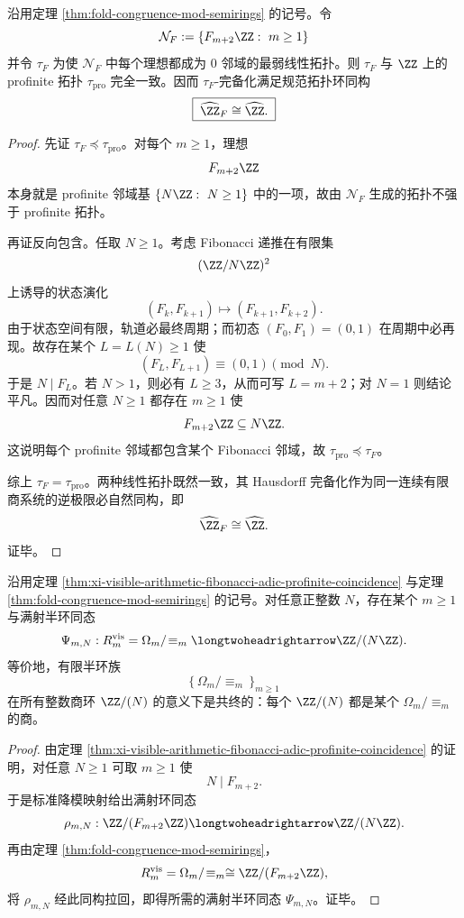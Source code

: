 \begin{theorem}\label{thm:xi-visible-arithmetic-fibonacci-adic-profinite-coincidence}
沿用定理 \ref{thm:fold-congruence-mod-semirings} 的记号。令
\[
\mathcal N_F:=\{F_{m+2}\ZZ:\ m\ge 1\}
\]
并令 \(\tau_F\) 为使 \(\mathcal N_F\) 中每个理想都成为 \(0\) 邻域的最弱线性拓扑。则 \(\tau_F\) 与 \(\ZZ\) 上的 profinite 拓扑 \(\tau_{\mathrm{pro}}\) 完全一致。因而 \(\tau_F\)-完备化满足规范拓扑环同构
\[
\boxed{\;
\widehat{\ZZ}_F\cong \widehat{\ZZ}.\;}
\]
\end{theorem}
\begin{proof}
先证 \(\tau_F\preceq\tau_{\mathrm{pro}}\)。对每个 \(m\ge 1\)，理想
\[
F_{m+2}\ZZ
\]
本身就是 profinite 邻域基 \(\{N\ZZ:\ N\ge 1\}\) 中的一项，故由 \(\mathcal N_F\) 生成的拓扑不强于 profinite 拓扑。

再证反向包含。任取 \(N\ge 1\)。考虑 Fibonacci 递推在有限集
\[
(\ZZ/N\ZZ)^2
\]
上诱导的状态演化
\[
(F_k,F_{k+1})\longmapsto (F_{k+1},F_{k+2}).
\]
由于状态空间有限，轨道必最终周期；而初态 \((F_0,F_1)=(0,1)\) 在周期中必再现。故存在某个 \(L=L(N)\ge 1\) 使
\[
(F_L,F_{L+1})\equiv (0,1)\pmod N.
\]
于是 \(N\mid F_L\)。若 \(N>1\)，则必有 \(L\ge 3\)，从而可写 \(L=m+2\)；对 \(N=1\) 则结论平凡。因而对任意 \(N\ge 1\) 都存在 \(m\ge 1\) 使
\[
F_{m+2}\ZZ\subseteq N\ZZ.
\]
这说明每个 profinite 邻域都包含某个 Fibonacci 邻域，故 \(\tau_{\mathrm{pro}}\preceq\tau_F\)。

综上 \(\tau_F=\tau_{\mathrm{pro}}\)。两种线性拓扑既然一致，其 Hausdorff 完备化作为同一连续有限商系统的逆极限必自然同构，即
\[
\widehat{\ZZ}_F\cong \widehat{\ZZ}.
\]
证毕。
\end{proof}

\begin{corollary}[可见同余半环族对全部有限模算术的共终性]\label{cor:xi-visible-arithmetic-fibonacci-cofinal-quotients}
沿用定理 \ref{thm:xi-visible-arithmetic-fibonacci-adic-profinite-coincidence} 与定理 \ref{thm:fold-congruence-mod-semirings} 的记号。对任意正整数 \(N\)，存在某个 \(m\ge 1\) 与满射半环同态
\[
\Psi_{m,N}:R_m^{\mathrm{vis}}=\Omega_m/\!\equiv_m\longtwoheadrightarrow \ZZ/(N\ZZ).
\]
等价地，有限半环族
\[
\{\,\Omega_m/\!\equiv_m\,\}_{m\ge 1}
\]
在所有整数商环 \(\ZZ/(N)\) 的意义下是共终的：每个 \(\ZZ/(N)\) 都是某个 \(\Omega_m/\!\equiv_m\) 的商。
\end{corollary}
\begin{proof}
由定理 \ref{thm:xi-visible-arithmetic-fibonacci-adic-profinite-coincidence} 的证明，对任意 \(N\ge 1\) 可取 \(m\ge 1\) 使
\[
N\mid F_{m+2}.
\]
于是标准降模映射给出满射环同态
\[
\rho_{m,N}:\ZZ/(F_{m+2}\ZZ)\longtwoheadrightarrow \ZZ/(N\ZZ).
\]
再由定理 \ref{thm:fold-congruence-mod-semirings}，
\[
R_m^{\mathrm{vis}}=\Omega_m/\!\equiv_m\cong \ZZ/(F_{m+2}\ZZ),
\]
将 \(\rho_{m,N}\) 经此同构拉回，即得所需的满射半环同态 \(\Psi_{m,N}\)。证毕。
\end{proof}

